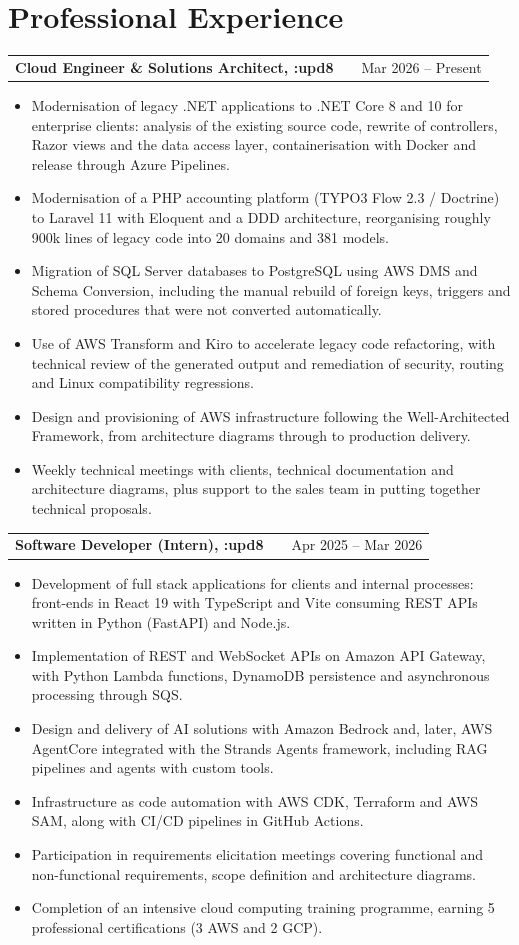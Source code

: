 \documentclass[a4paper,11pt]{article}
\makeatletter
\newenvironment{joblong}[2]
    {
    \begin{tabularx}{\linewidth}{@{}l X r@{}}
    \textbf{#1} & \hfill &  #2 \\[3.75pt]
    \end{tabularx}
    \begin{minipage}[t]{\linewidth}
    \begin{itemize}[nosep,after=\strut, leftmargin=1em, itemsep=3pt,label=--]
    }
    {
    \end{itemize}
    \end{minipage}
    }
\makeatother
\begin{document}
\section{Professional Experience}

\begin{joblong}{Cloud Engineer \& Solutions Architect, :upd8}{Mar 2026 -- Present}
\item Modernisation of legacy .NET applications to .NET Core 8 and 10 for enterprise clients: analysis of the existing source code, rewrite of controllers, Razor views and the data access layer, containerisation with Docker and release through Azure Pipelines.
\item Modernisation of a PHP accounting platform (TYPO3 Flow 2.3 / Doctrine) to Laravel 11 with Eloquent and a DDD architecture, reorganising roughly 900k lines of legacy code into 20 domains and 381 models.
\item Migration of SQL Server databases to PostgreSQL using AWS DMS and Schema Conversion, including the manual rebuild of foreign keys, triggers and stored procedures that were not converted automatically.
\item Use of AWS Transform and Kiro to accelerate legacy code refactoring, with technical review of the generated output and remediation of security, routing and Linux compatibility regressions.
\item Design and provisioning of AWS infrastructure following the Well-Architected Framework, from architecture diagrams through to production delivery.
\item Weekly technical meetings with clients, technical documentation and architecture diagrams, plus support to the sales team in putting together technical proposals.
\end{joblong}

\begin{joblong}{Software Developer (Intern), :upd8}{Apr 2025 -- Mar 2026}
\item Development of full stack applications for clients and internal processes: front-ends in React 19 with TypeScript and Vite consuming REST APIs written in Python (FastAPI) and Node.js.
\item Implementation of REST and WebSocket APIs on Amazon API Gateway, with Python Lambda functions, DynamoDB persistence and asynchronous processing through SQS.
\item Design and delivery of AI solutions with Amazon Bedrock and, later, AWS AgentCore integrated with the Strands Agents framework, including RAG pipelines and agents with custom tools.
\item Infrastructure as code automation with AWS CDK, Terraform and AWS SAM, along with CI/CD pipelines in GitHub Actions.
\item Participation in requirements elicitation meetings covering functional and non-functional requirements, scope definition and architecture diagrams.
\item Completion of an intensive cloud computing training programme, earning 5 professional certifications (3 AWS and 2 GCP).
\end{joblong}
\end{document}
